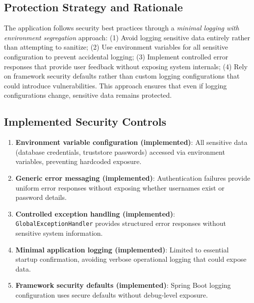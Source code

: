 \documentclass[]{UCD_CS_FYP_Report}
\begin{document}
\subsection{Protection Strategy and Rationale}
The application follows security best practices through a \textit{minimal logging with environment segregation} approach: (1) Avoid logging sensitive data entirely rather than attempting to sanitize; (2) Use environment variables for all sensitive configuration to prevent accidental logging; (3) Implement controlled error responses that provide user feedback without exposing system internals; (4) Rely on framework security defaults rather than custom logging configurations that could introduce vulnerabilities. This approach ensures that even if logging configurations change, sensitive data remains protected.

\subsection{Implemented Security Controls}
\begin{enumerate}
	\item \textbf{Environment variable configuration (implemented)}: All sensitive data (database credentials, truststore passwords) accessed via environment variables, preventing hardcoded exposure.
	\item \textbf{Generic error messaging (implemented)}: Authentication failures provide uniform error responses without exposing whether usernames exist or password details.
	\item \textbf{Controlled exception handling (implemented)}: \texttt{GlobalExceptionHandler} provides structured error responses without sensitive system information.
	\item \textbf{Minimal application logging (implemented)}: Limited to essential startup confirmation, avoiding verbose operational logging that could expose data.
	\item \textbf{Framework security defaults (implemented)}: Spring Boot logging configuration uses secure defaults without debug-level exposure.
\end{enumerate}
\end{document}

